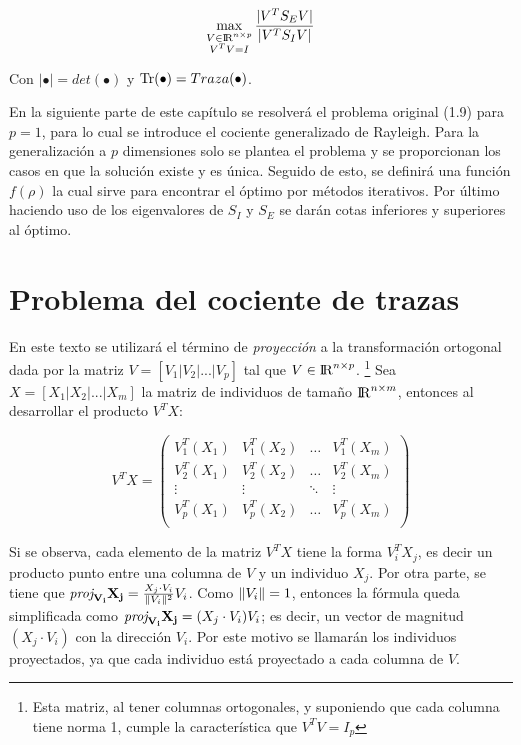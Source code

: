 \begin{equation} \label{eq:2.8}
	\max_{\substack{V \in {\rm I\!R}^{n \times p} \\ V^T V = I}} \frac{|V^T S_E V|}{|V^T S_I V|} 	
\end{equation}

Con $|\bullet| = det(\bullet)$ y $\Tr(\bullet) = Traza(\bullet)$.


En la siguiente parte de este capítulo se resolverá el problema original (1.9) para $p = 1$, para lo cual se introduce el cociente generalizado de Rayleigh. Para la generalización a $p$ dimensiones solo se plantea el problema y se proporcionan los casos en que la solución existe y es única. Seguido de esto, se definirá una función $f(\rho)$ la cual sirve para encontrar el óptimo por métodos iterativos. Por último haciendo uso de los eigenvalores de $S_I$ y $S_E$ se darán cotas inferiores y superiores al óptimo.

\section{Problema del cociente de trazas}

En este texto se utilizará el término de \textit{proyección} a la transformación ortogonal dada por la matriz $V = [V_1 | V_2 | ... | V_p ]$ tal que $V \in {\rm I\!R}^{n \times p}$. \footnote{Esta matriz, al tener columnas ortogonales, y suponiendo que cada columna tiene norma 1, cumple la característica que $V^T V = I_p$} Sea $X = [X_1 | X_2 | ... | X_m ]$ la matriz de individuos de tamaño ${\rm I\!R}^{n \times m}$, entonces al desarrollar el producto $V^T X$:

\begin{equation*}
V^T X= \left(\!
    \begin{array}{cccc}
      V_1^T (X_1) &  V_1^T (X_2) & \hdots & V_1^T (X_m) \\
      V_2^T (X_1) &  V_2^T (X_2) & \hdots & V_2^T (X_m) \\
      \vdots & \vdots & \ddots & \vdots\\
      V_p^T (X_1) &  V_p^T (X_2) & \hdots & V_p^T (X_m) \\
    \end{array}
  \!\right) 
\end{equation*} 

Si se observa, cada elemento de la matriz $V^T X$ tiene la forma $V_i^T X_j$, es decir un producto punto entre una columna de $V$ y un individuo $X_j$. Por otra parte, se tiene que $\vectorproj[V_i]{X_j} = \frac{X_j \cdot V_i}{\norm{V_i}^2} V_i$. Como $\norm{V_i} = 1$, entonces la fórmula queda simplificada como $\vectorproj[V_i]{X_j} = (X_j \cdot V_i) V_i$; es decir, un vector de magnitud $(X_j \cdot V_i)$ con la dirección $V_i$. Por este motivo se llamarán los individuos proyectados, ya que cada individuo está proyectado a cada columna de $V$.

